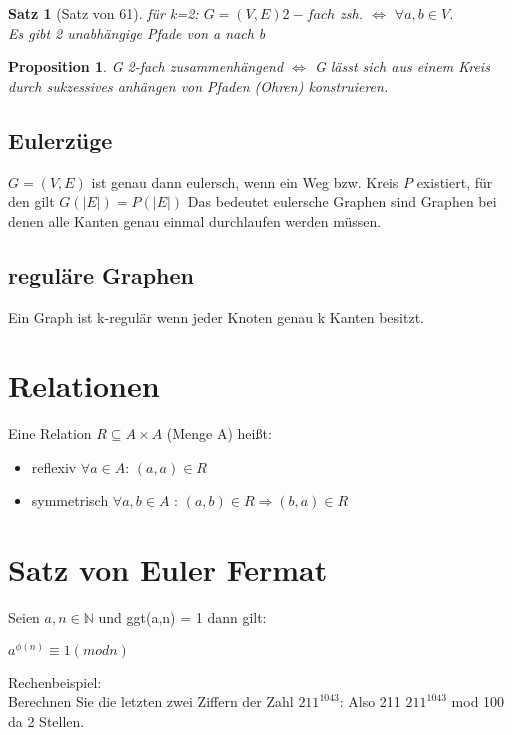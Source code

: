 \documentclass[12pt, letterpaper, twoside]{article}
\newtheorem{theorem}{Satz}[section]
\newtheorem{proposition}{Proposition}[section]
\newcommand{\forallin}[2]{$ \forall #1 \in #2 $}
\begin{document}
\begin{theorem}[Satz von 61]
für k=2: $G=(V,E) 2-fach$ zsh. $ \Leftrightarrow $ \forallin{a, b}{V}. \\
Es gibt 2 unabhängige Pfade von a nach b
 \end{theorem}
 \begin{proposition}
	 G 2-fach zusammenhängend $\Leftrightarrow$ G lässt sich aus einem Kreis durch sukzessives anhängen von Pfaden (Ohren) konstruieren.
 \end{proposition}

 \subsection{Eulerzüge}
 $G=(V,E)$ ist genau dann eulersch, wenn ein Weg bzw. Kreis $P$ existiert, für den gilt $G( |E| )=P( |E| )$
 Das bedeutet eulersche Graphen sind Graphen bei denen alle Kanten genau einmal durchlaufen werden müssen.

\subsection{reguläre Graphen}
Ein Graph ist k-regulär wenn jeder Knoten genau k Kanten besitzt.

\section{Relationen}
Eine Relation $R \subseteq A \times A$ (Menge A) heißt:
	\begin{itemize}
		\item reflexiv \forallin{a}{A}: $(a,a) \in R$
		\item symmetrisch \forallin{a,b}{A} : $(a,b) \in R \Rightarrow (b,a) \in R $ 
	\end{itemize}

\section{Satz von Euler Fermat}
Seien $ a,n \in  \mathbb{N} $ und ggt(a,n) = 1 dann gilt: \\
\begin{center}
$ a^{\phi (n)} \equiv 1 (mod n) $ \\
\end{center}
Rechenbeispiel: \\
Berechnen Sie die letzten zwei Ziffern der Zahl $ 211^{1043} $:
Also 211 $ 211^{1043} $ mod 100 da 2 Stellen.
\end{document}
